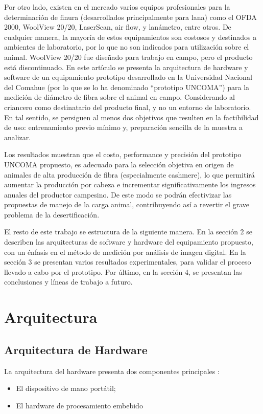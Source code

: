 \documentclass[runningheads,a4paper]{llncs}
\begin{document}
Por otro lado, existen en el mercado varios equipos profesionales para la determinación de finura (desarrollados principalmente para lana) como el OFDA 2000, WoolView 20/20, LaserScan, air flow, y lanámetro, entre otros. De cualquier manera, la mayoría de estos equipamientos son costosos y destinados a ambientes de laboratorio, por lo que no son indicados para utilización sobre el animal. WoolView 20/20 fue diseñado para trabajo en campo, pero el producto está discontinuado.
En este artículo se presenta la arquitectura de hardware y software de un equipamiento prototipo desarrollado en la Universidad Nacional del Comahue (por lo que se lo ha denominado ``prototipo UNCOMA'') para la medición de diámetro de fibra sobre el animal en campo. Considerando al criancero como destinatario del 
producto final, y no un entorno de laboratorio. En tal sentido, se persiguen al menos dos objetivos que 
resulten en la factibilidad de uso: entrenamiento previo mínimo y, preparación sencilla de la muestra a 
analizar.  
 
Los resultados muestran que el costo, performance y precisión del prototipo UNCOMA propuesto, es adecuado para la selección objetiva en origen de animales de alta producción de fibra (especialmente cashmere), lo que permitirá aumentar la producción por cabeza e incrementar significativamente los ingresos anuales del productor campesino. De este modo se podrán efectivizar las propuestas de manejo de la carga animal, contribuyendo así a revertir el grave problema de la desertificación.

El resto de este trabajo se estructura de la siguiente manera. En la sección 2 se describen
las arquitecturas de software y hardware del equipamiento propuesto, con un énfasis en
el método de medición por análisis de imagen digital. En la sección 3 se presentan varios
resultados experimentales, para validar el proceso llevado a cabo por el prototipo.
Por último, en la sección 4, se presentan las conclusiones y líneas de trabajo a futuro.

\section{Arquitectura}

\subsection{Arquitectura de Hardware}

La arquitectura del hardware presenta dos componentes principales :
\begin{itemize}
\item El dispositivo de mano portátil;
\item El hardware de procesamiento embebido
\end{itemize}
\end{document}
